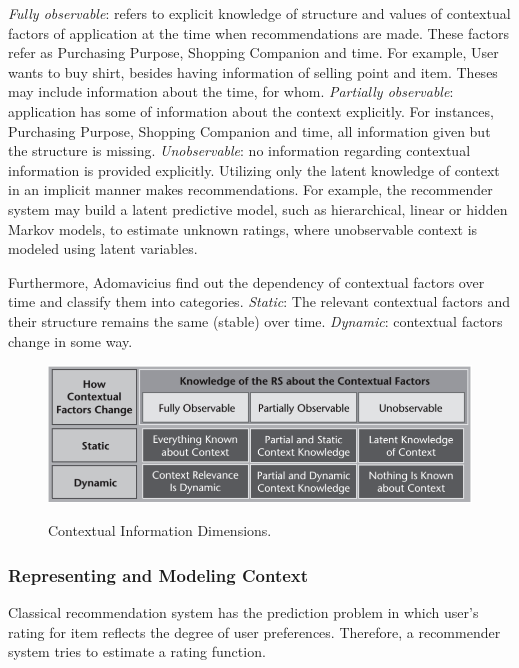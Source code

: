 \textit{Fully observable}: refers to explicit knowledge of structure and values of contextual factors of application at the time when recommendations are made. These factors refer as Purchasing Purpose, Shopping Companion and time. For example, User wants to buy shirt, besides having information of selling point and item. Theses may include information about the time, for whom. \textit{Partially observable}: application has some of information about the context explicitly. For instances, Purchasing Purpose, Shopping Companion and time, all information given but the structure is missing. \textit{Unobservable}: no information regarding contextual information is provided explicitly. Utilizing only the latent knowledge of context in an implicit manner makes recommendations. For example, the recommender system may build a latent predictive model, such as hierarchical, linear or hidden Markov models, to estimate unknown ratings, where unobservable context is modeled using latent variables.\newline

Furthermore, Adomavicius \cite{adomavicius2011context} find out the dependency of contextual factors over time and classify them into categories. \textit{Static}: The relevant contextual factors and their structure remains the same (stable) over time. \textit{Dynamic}: contextual factors change in some way.

\begin{figure}[h]
	\centering
	\includegraphics[width=.98\linewidth]{figures/ch2_context_dimensions.png}
	\caption{Contextual Information Dimensions.} 
	\cite{adomavicius2011context}
	\label{fig:ch2_context_dimensions}
\end{figure}

\subsubsection{Representing and Modeling Context}

Classical recommendation system has the prediction problem in which user’s rating for item reflects the degree of user preferences. Therefore, a recommender system tries to estimate a rating function.

